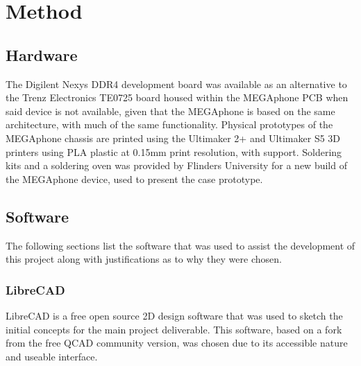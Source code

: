 
\chapter{Method} %

\label{Chapter3} %


\section{Hardware}

The Digilent Nexys DDR4 development board was available as an alternative to the Trenz Electronics TE0725 board housed within the MEGAphone PCB when said device is not available, given that the MEGAphone is based on the same architecture, with much of the same functionality.
Physical prototypes of the MEGAphone chassis are printed using the Ultimaker 2+ and Ultimaker S5 3D printers using PLA plastic at 0.15mm print resolution, with support.
Soldering kits and a soldering oven was provided by Flinders University for a new build of the MEGAphone device, used to present the case prototype.


\section{Software}

The following sections list the software that was used to assist the development of this project along with justifications as to why they were chosen.


\subsection{LibreCAD}

LibreCAD is a free open source 2D design software that was used to sketch the initial concepts for the main project deliverable. 
This software, based on a fork from the free QCAD community version, was chosen due to its accessible nature and useable interface.

